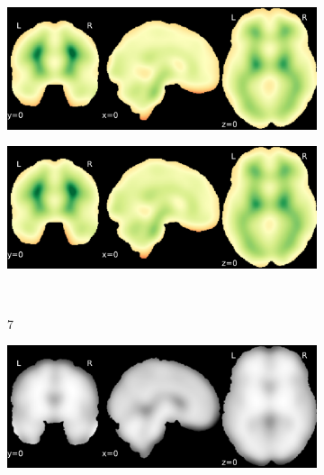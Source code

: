 \documentclass{article}
\begin{document}
\begin{appendices}
\begin{landscape}
\begin{figure}
\begin{subfigure}[t]{0.2\paperheight}
            \end{subfigure}
            \begin{subfigure}[t]{0.2\paperheight}
                \centering
                \includegraphics[width=\textwidth]{figures/sig/20mm/rs_ds001748_sub-adult16_sig.pdf}
            \end{subfigure}
            \begin{subfigure}[t]{0.2\paperheight}
                \centering
                \includegraphics[width=\textwidth]{figures/sig/20mm/rr.rs_ds001748_sub-adult16_sig.pdf}
            \end{subfigure} \\
            \begin{subfigure}[b][][c]{0.01\paperwidth} 7 \vspace*{15pt} \end{subfigure}
            \begin{subfigure}[t]{0.2\paperheight}
                \centering
                \includegraphics[width=\textwidth]{figures/sig/20mm/ieee_ds002338_sub-xp201.pdf}

\end{subfigure}
\end{figure}
\end{landscape}
\end{appendices}
\end{document}
